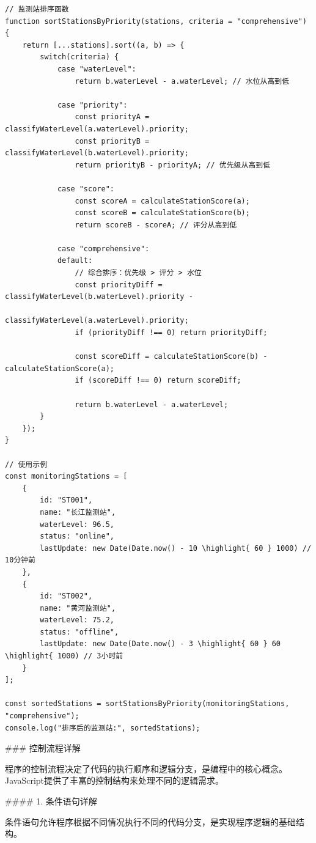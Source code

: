 {\begin{lstlisting}[style=javascript]
// 监测站排序函数
function sortStationsByPriority(stations, criteria = "comprehensive") {
    return [...stations].sort((a, b) => {
        switch(criteria) {
            case "waterLevel":
                return b.waterLevel - a.waterLevel; // 水位从高到低
                
            case "priority":
                const priorityA = classifyWaterLevel(a.waterLevel).priority;
                const priorityB = classifyWaterLevel(b.waterLevel).priority;
                return priorityB - priorityA; // 优先级从高到低
                
            case "score":
                const scoreA = calculateStationScore(a);
                const scoreB = calculateStationScore(b);
                return scoreB - scoreA; // 评分从高到低
                
            case "comprehensive":
            default:
                // 综合排序：优先级 > 评分 > 水位
                const priorityDiff = classifyWaterLevel(b.waterLevel).priority - 
                                   classifyWaterLevel(a.waterLevel).priority;
                if (priorityDiff !== 0) return priorityDiff;
                
                const scoreDiff = calculateStationScore(b) - calculateStationScore(a);
                if (scoreDiff !== 0) return scoreDiff;
                
                return b.waterLevel - a.waterLevel;
        }
    });
}

// 使用示例
const monitoringStations = [
    { 
        id: "ST001", 
        name: "长江监测站", 
        waterLevel: 96.5, 
        status: "online",
        lastUpdate: new Date(Date.now() - 10 \highlight{ 60 } 1000) // 10分钟前
    },
    { 
        id: "ST002", 
        name: "黄河监测站", 
        waterLevel: 75.2, 
        status: "offline",
        lastUpdate: new Date(Date.now() - 3 \highlight{ 60 } 60 \highlight{ 1000) // 3小时前
    }
];

const sortedStations = sortStationsByPriority(monitoringStations, "comprehensive");
console.log("排序后的监测站:", sortedStations);
\end{lstlisting}

### 控制流程详解

程序的控制流程决定了代码的执行顺序和逻辑分支，是编程中的核心概念。JavaScript提供了丰富的控制结构来处理不同的逻辑需求。

#### 1. 条件语句详解

条件语句允许程序根据不同情况执行不同的代码分支，是实现程序逻辑的基础结构。

}
